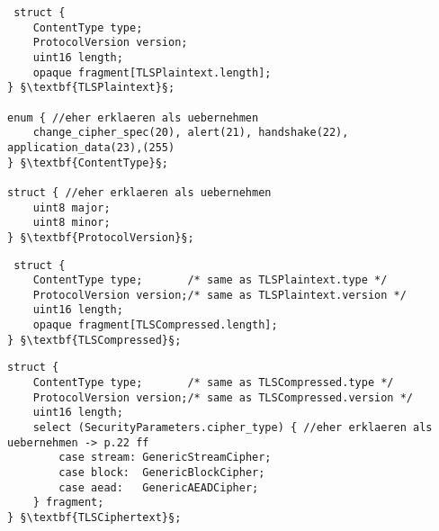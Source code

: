 \begin{lstlisting}
 struct {
	ContentType type;  
	ProtocolVersion version; 
	uint16 length;
	opaque fragment[TLSPlaintext.length];
} §\textbf{TLSPlaintext}§;

enum { //eher erklaeren als uebernehmen
	change_cipher_spec(20), alert(21), handshake(22), application_data(23),(255)
} §\textbf{ContentType}§;

struct { //eher erklaeren als uebernehmen
	uint8 major;
	uint8 minor;
} §\textbf{ProtocolVersion}§;
\end{lstlisting}

\begin{lstlisting}
 struct {
	ContentType type;       /* same as TLSPlaintext.type */
	ProtocolVersion version;/* same as TLSPlaintext.version */
	uint16 length;
	opaque fragment[TLSCompressed.length];
} §\textbf{TLSCompressed}§;
\end{lstlisting}

\begin{lstlisting}
struct {
	ContentType type;       /* same as TLSCompressed.type */
	ProtocolVersion version;/* same as TLSCompressed.version */
	uint16 length;
	select (SecurityParameters.cipher_type) { //eher erklaeren als uebernehmen -> p.22 ff
	    case stream: GenericStreamCipher;
	    case block:  GenericBlockCipher;
	    case aead:   GenericAEADCipher;
	} fragment;
} §\textbf{TLSCiphertext}§;
\end{lstlisting}
